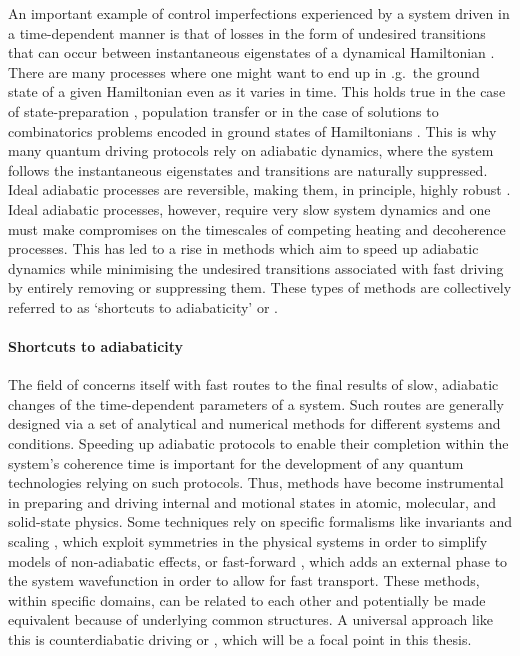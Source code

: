 An important example of control imperfections experienced by a system driven in a time-dependent manner is that of losses in the form of undesired transitions that can occur between instantaneous eigenstates of a dynamical Hamiltonian \cite{berry_transitionless_2009, kolodrubetz_geometry_2017}. There are many processes where one might want to end up in \@e.g.~the ground state of a given Hamiltonian even as it varies in time. This holds true in the case of state-preparation \cite{dimitrova_many-body_2023}, population transfer \cite{meier_counterdiabatic_2020} or in the case of solutions to combinatorics problems encoded in ground states of Hamiltonians \cite{pichler_quantum_2018, ebadi_quantum_2022}. This is why many quantum driving protocols rely on adiabatic dynamics, where the system follows the instantaneous eigenstates and transitions are naturally suppressed\cite{born_beweis_1928, kato_adiabatic_1950}. Ideal adiabatic processes are reversible, making them, in principle, highly robust \cite{jarzynski_geometric_1995, kolodrubetz_geometry_2017}. Ideal adiabatic processes, however, require very slow system dynamics and one must make compromises on the timescales of competing heating and decoherence processes. This has led to a rise in methods which aim to speed up adiabatic dynamics while minimising the undesired transitions associated with fast driving by entirely removing or suppressing them. These types of methods are collectively referred to as `shortcuts to adiabaticity' or  \cite{guery-odelin_shortcuts_2019, torrontegui_chapter_2013}. 

\paragraph*{Shortcuts to adiabaticity} 

The field of  concerns itself with fast routes to the final results of slow, adiabatic changes of the time-dependent parameters of a system. Such routes are generally designed via a set of analytical and numerical methods for different systems and conditions. Speeding up adiabatic protocols to enable their completion within the system’s coherence time is important
for the development of any quantum technologies relying on such protocols. Thus,  methods have become instrumental in preparing and driving internal and motional states in atomic, molecular, and solid-state physics. Some  techniques rely on specific formalisms like invariants and scaling \cite{deffner_classical_2014, deng_superadiabatic_2018, chen_fast_2010}, which exploit symmetries in the physical systems in order to simplify models of non-adiabatic effects, or fast-forward \cite{masuda_fast-forward_2009, masuda_fast-forward_2008}, which adds an external phase to the system wavefunction in order to allow for fast transport. These methods, within specific domains, can be related to each other and potentially be made equivalent because of underlying common structures. A universal  approach like this is counterdiabatic driving or , which will be a focal point in this thesis. 


